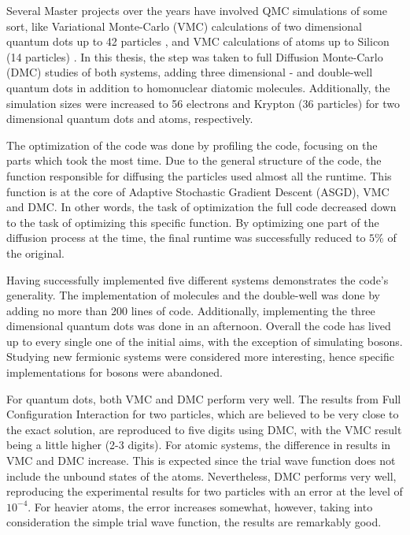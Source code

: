 Several Master projects over the years have involved QMC simulations of some sort, like Variational Monte-Carlo (VMC) calculations of two dimensional quantum dots up to 42 particles \cite{larseivind}, and VMC calculations of atoms up to Silicon (14 particles) \cite{vmcAtoms}. In this thesis, the step was taken to full Diffusion Monte-Carlo (DMC) studies of both systems, adding three dimensional - and double-well quantum dots in addition to homonuclear diatomic molecules. Additionally, the simulation sizes were increased to 56 electrons and Krypton (36 particles) for two dimensional quantum dots and atoms, respectively.    

The optimization of the code was done by profiling the code, focusing on the parts which took the most time. Due to the general structure of the code, the function responsible for diffusing the particles used almost all the runtime. This function is at the core of Adaptive Stochastic Gradient Descent (ASGD), VMC and DMC. In other words, the task of optimization the full code decreased down to the task of optimizing this specific function. By optimizing one part of the diffusion process at the time, the final runtime was successfully reduced to $5\%$ of the original.

Having successfully implemented five different systems demonstrates the code's generality. The implementation of molecules and the double-well was done by adding no more than 200 lines of code. Additionally,  implementing the three dimensional quantum dots was done in an afternoon. Overall the code has lived up to every single one of the initial aims, with the exception of simulating bosons. Studying new fermionic systems were considered more interesting, hence specific implementations for bosons were abandoned.  

For quantum dots, both VMC and DMC perform very well. The results from Full Configuration Interaction \cite{Olsen} for two particles, which are believed to be very close to the exact solution, are reproduced to five digits using DMC, with the VMC result being a little higher (2-3 digits). For atomic systems, the difference in results in VMC and DMC increase. This is expected since the trial wave function does not include the unbound states of the atoms. Nevertheless, DMC performs very well, reproducing the experimental results for two particles with an error at the level of $10^{-4}$. For heavier atoms, the error increases somewhat, however, taking into consideration the simple trial wave function, the results are remarkably good.

